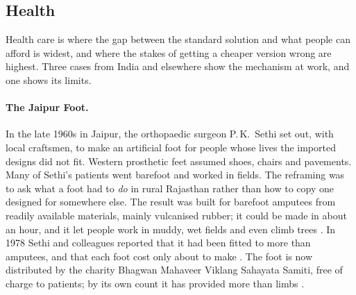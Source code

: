 \subsection{Health}
\label{sec:health}

Health care is where the gap between the standard solution and what people can
afford is widest, and where the stakes of getting a cheaper version wrong are
highest. Three cases from India and elsewhere show the mechanism at work, and
one shows its limits.

\paragraph{The Jaipur Foot.} In the late 1960s in Jaipur, the orthopaedic
surgeon P.\,K.\ Sethi set out, with local craftsmen, to make an artificial
foot for people whose lives the imported designs did not fit. Western
prosthetic feet assumed shoes, chairs and pavements. Many of Sethi's patients
went barefoot and worked in fields. The reframing was to ask what a foot had to
\emph{do} in rural Rajasthan rather than how to copy one designed for
somewhere else. The result was built for barefoot amputees from readily
available materials, mainly vulcanised rubber; it could be made in about an
hour, and it let people work in muddy, wet fields and even climb trees
\parencite{arya2008,sethi1978}. In 1978 Sethi
and colleagues reported that it had been fitted to more than
\jaipurAmputees{} amputees, and that each foot cost only about
\jaipurCostOrig{} to make \parencite{sethi1978}. The foot is now distributed by
the charity Bhagwan Mahaveer Viklang Sahayata Samiti, free of charge to
patients; by its own count it has provided more than \bmvssLimbs{} limbs
\parencite{bmvss2026}.

